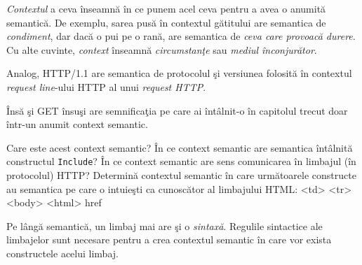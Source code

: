 \textsl{Contextul} a ceva înseamnă în ce punem acel ceva pentru a
avea o anumită semantică. De exemplu, sarea pusă în contextul
gătitului are semantica de \textit{condiment}, dar dacă
o pui pe o rană, are semantica de \textit{ceva care provoacă durere}.
Cu alte cuvinte, \textsl{context} înseamnă
\textsl{circumstanţe} sau \textsl{mediul înconjurător}. 

Analog, {\glqq}HTTP/1.1{\grqq} are semantica de {\glqq}protocolul şi versiunea folosită{\grqq}
în contextul \textit{request line}-ului HTTP al unui \textit{request HTTP}.

\begin{Exercise}[title={Întrebări de sinteză},difficulty=2]
Însă şi GET însuşi are semnificaţia pe care ai întâlnit-o în capitolul
trecut doar într-un anumit context semantic.

\Question Care este acest context semantic?
\Question În ce context semantic are semantica întâlnită constructul \texttt{Include}?
\Question În ce context semantic are sens comunicarea în limbajul (în protocolul) HTTP?
\ExeText Determină contextul semantic în care următoarele constructe au semantica pe
care o intuieşti ca cunoscător al limbajului HTML:
\Question <td>
\Question <tr>
\Question <body>
\Question <html>
\Question href
\end{Exercise}



Pe lângă semantică, un limbaj mai are şi o \textsl{sintaxă}. Regulile sintactice
ale limbajelor sunt necesare pentru a crea contextul semantic în
care vor exista constructele acelui limbaj.

